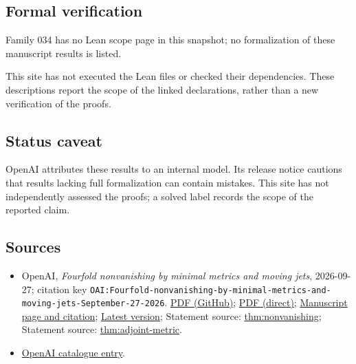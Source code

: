 \documentclass[11pt]{article}
\begin{document}
\subsection{Formal verification}
Family 034 has no Lean scope page in this snapshot; no formalization of these manuscript results is listed.

This site has not executed the Lean files or checked their dependencies. These descriptions report the scope of the linked declarations, rather than a new verification of the proofs.

\subsection{Status caveat}
OpenAI attributes these results to an internal model. Its release notice cautions that results lacking full formalization can contain mistakes. This site has not independently assessed the proofs; a solved label records the scope of the reported claim.

\subsection{Sources}
\begin{itemize}
\item OpenAI, \emph{Fourfold nonvanishing by minimal metrics and moving jets}, 2026-09-27; citation key \texttt{OAI:Fourfold-nonvanishing-by-minimal-metrics-and-moving-jets-September-27-2026}. \href{https://github.com/openai/math/blob/adc7f1241b42e322a6451854ab7e4b4c146bf78a/preprints/Fourfold-nonvanishing-by-minimal-metrics-and-moving-jets-September-27-2026/paper.pdf}{PDF (GitHub)}; \href{https://github.com/openai/math/raw/adc7f1241b42e322a6451854ab7e4b4c146bf78a/preprints/Fourfold-nonvanishing-by-minimal-metrics-and-moving-jets-September-27-2026/paper.pdf}{PDF (direct)}; \href{https://github.com/openai/math/blob/adc7f1241b42e322a6451854ab7e4b4c146bf78a/preprints/Fourfold-nonvanishing-by-minimal-metrics-and-moving-jets-September-27-2026/README.md}{Manuscript page and citation}; \href{https://github.com/openai/math/blob/main/preprints/Fourfold-nonvanishing-by-minimal-metrics-and-moving-jets-September-27-2026/paper.pdf}{Latest version}; Statement source: \href{https://github.com/openai/math/blob/adc7f1241b42e322a6451854ab7e4b4c146bf78a/preprints/Fourfold-nonvanishing-by-minimal-metrics-and-moving-jets-September-27-2026/build/sections/introduction.tex\#L21}{thm:nonvanishing}; Statement source: \href{https://github.com/openai/math/blob/adc7f1241b42e322a6451854ab7e4b4c146bf78a/preprints/Fourfold-nonvanishing-by-minimal-metrics-and-moving-jets-September-27-2026/build/sections/analytic-inputs.tex\#L16}{thm:adjoint-metric}.
\item \href{https://github.com/openai/math/blob/adc7f1241b42e322a6451854ab7e4b4c146bf78a/CONTENTS.md}{OpenAI catalogue entry}.
\end{itemize}
\end{document}
